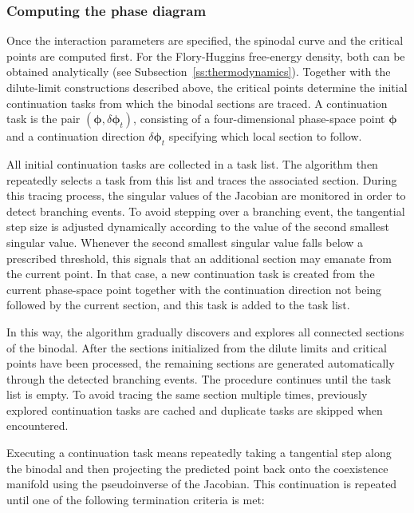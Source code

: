 \documentclass[12pt]{article}
\begin{document}
\subsubsection{Computing the phase diagram}

Once the interaction parameters are specified, the spinodal curve and the critical points are computed first.
For the Flory-Huggins free-energy density, both can be obtained analytically (see Subsection~\ref{ss:thermodynamics}).
Together with the dilute-limit constructions described above, the critical points determine the initial continuation tasks from which the binodal sections are traced.
A continuation task is the pair \((\boldsymbol{\phi}, \delta\boldsymbol{\phi}_t)\), consisting of a four-dimensional phase-space point \(\boldsymbol{\phi}\) and a continuation direction \(\delta\boldsymbol{\phi}_t\) specifying which local section to follow.

All initial continuation tasks are collected in a task list.
The algorithm then repeatedly selects a task from this list and traces the associated section.
During this tracing process, the singular values of the Jacobian are monitored in order to detect branching events.
To avoid stepping over a branching event, the tangential step size is adjusted dynamically according to the value of the second smallest singular value.
Whenever the second smallest singular value falls below a prescribed threshold, this signals that an additional section may emanate from the current point.
In that case, a new continuation task is created from the current phase-space point together with the continuation direction not being followed by the current section, and this task is added to the task list.

In this way, the algorithm gradually discovers and explores all connected sections of the binodal.
After the sections initialized from the dilute limits and critical points have been processed, the remaining sections are generated automatically through the detected branching events.
The procedure continues until the task list is empty. To avoid tracing the same section multiple times, previously explored continuation tasks are cached and duplicate tasks are skipped when encountered.

Executing a continuation task means repeatedly taking a tangential step along the binodal and then projecting the predicted point back onto the coexistence manifold using the pseudoinverse of the Jacobian.
This continuation is repeated until one of the following termination criteria is met:
\end{document}

